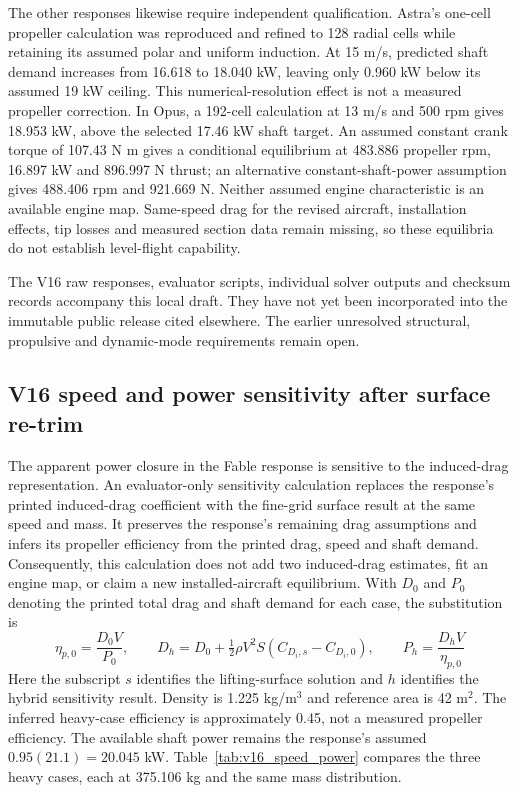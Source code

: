 \documentclass[11pt,a4paper]{article}
\begin{document}
The other responses likewise require independent qualification. Astra's one-cell
propeller calculation was reproduced and refined to 128 radial cells while retaining
its assumed polar and uniform induction. At 15 m/s, predicted shaft demand increases
from 16.618 to 18.040 kW, leaving only 0.960 kW below its assumed 19 kW ceiling.
This numerical-resolution effect is not a measured propeller correction. In Opus,
a 192-cell calculation at 13 m/s and 500 rpm gives 18.953 kW, above the selected
17.46 kW shaft target. An assumed constant crank torque of 107.43 N m gives a
conditional equilibrium at 483.886 propeller rpm, 16.897 kW and 896.997 N thrust;
an alternative constant-shaft-power assumption gives 488.406 rpm and 921.669 N.
Neither assumed engine characteristic is an available engine map. Same-speed drag
for the revised aircraft, installation effects, tip losses and measured section data
remain missing, so these equilibria do not establish level-flight capability.

The V16 raw responses, evaluator scripts, individual solver outputs and checksum
records accompany this local draft. They have not yet been incorporated into the
immutable public release cited elsewhere. The earlier unresolved structural,
propulsive and dynamic-mode requirements remain open.


\subsection{V16 speed and power sensitivity after surface re-trim}
\label{sec:v16_power_speed}
The apparent power closure in the Fable response is sensitive to the induced-drag
representation. An evaluator-only sensitivity calculation replaces the response's
printed induced-drag coefficient with the fine-grid surface result at the same
speed and mass. It preserves the response's remaining drag assumptions and infers
its propeller efficiency from the printed drag, speed and shaft demand. Consequently,
this calculation does not add two induced-drag estimates, fit an engine map, or
claim a new installed-aircraft equilibrium. With $D_0$ and $P_0$ denoting the printed
total drag and shaft demand for each case, the substitution is
\begin{equation}
\eta_{p,0}=\frac{D_0 V}{P_0},\qquad
D_h=D_0+\tfrac12\rho V^2 S(C_{D_i,s}-C_{D_i,0}),\qquad
P_h=\frac{D_h V}{\eta_{p,0}}
\end{equation}
Here the subscript $s$ identifies the lifting-surface solution and $h$ identifies
the hybrid sensitivity result. Density is 1.225 kg/m$^3$ and reference area is
42 m$^2$. The inferred heavy-case efficiency is approximately 0.45, not a measured
propeller efficiency. The available shaft power remains the response's assumed
$0.95(21.1)=20.045$ kW. Table~\ref{tab:v16_speed_power} compares the three heavy
cases, each at 375.106 kg and the same mass distribution.
\end{document}
